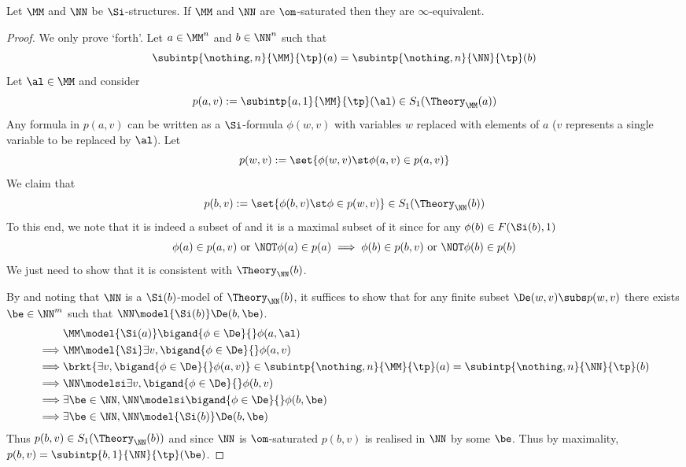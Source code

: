 \begin{prop}
    Let $\MM$ and $\NN$ be $\Si$-structures.
    If $\MM$ and $\NN$ are $\om$-saturated %
    then they are $\infty$-equivalent.
\end{prop}
\begin{proof}
    We only prove `forth'.
    Let $a \in \MM^n$ and $b \in \NN^n$ such that 
    \[\subintp{\nothing,n}{\MM}{\tp}(a) = 
    \subintp{\nothing,n}{\NN}{\tp}(b)\]
    Let $\al \in \MM$ and consider 
    \[p(a,v) := \subintp{a,1}{\MM}{\tp}(\al) \in S_1(\Theory_\MM(a))\]
    Any formula in $p(a,v)$ can be written as a 
    $\Si$-formula $\phi(w,v)$ with variables $w$
    replaced with elements of $a$ 
    ($v$ represents a single variable to be replaced by $\al$). 
    Let 
    \[p(w,v) := \set{\phi(w,v) \st \phi(a,v) \in p(a,v)}\]
    We claim that 
    \[p(b,v) := \set{\phi(b,v) \st \phi \in p(w,v)} \in S_1(\Theory_\NN(b))\]
    To this end, we note that it is indeed a subset of 
    and it is a maximal subset of it since for any $\phi(b) \in F(\Si(b),1)$
    \[\phi(a) \in p(a,v) \text{ or } \NOT \phi(a) \in p(a) \implies 
    \phi(b) \in p(b,v) \text{ or } \NOT \phi(b) \in p(b)\]
    We just need to show that it is consistent with $\Theory_\NN(b)$.

    By  
    and noting that $\NN$ is a $\Si(b)$-model of $\Theory_\NN(b)$,
    it suffices to show
    that for any finite subset $\De(w,v) \subs p(w,v)$ 
    there exists $\be \in \NN^m$ such that 
    $\NN \model{\Si(b)} \De(b,\be)$.
    \begin{align*}
        &\MM \model{\Si(a)} \bigand{\phi \in \De}{} \phi(a,\al)\\
        \implies &\MM \model{\Si} \exists v, \bigand{\phi \in \De}{} \phi(a,v)\\
        \implies &\brkt{\exists v, \bigand{\phi \in \De}{} \phi(a,v)} \in 
        \subintp{\nothing,n}{\MM}{\tp}(a) = 
        \subintp{\nothing,n}{\NN}{\tp}(b)\\
        \implies &\NN \modelsi \exists v, \bigand{\phi \in \De}{} \phi(b,v)\\
        \implies &\exists \be \in \NN, 
        \NN \modelsi \bigand{\phi \in \De}{} \phi(b,\be)\\
        \implies &\exists \be \in \NN, \NN \model{\Si(b)} \De(b,\be)
    \end{align*}
    Thus $p(b,v)\in S_1(\Theory_\NN(b))$ and since $\NN$ is $\om$-saturated
    $p(b,v)$ is realised in $\NN$ by some $\be$.
    Thus by maximality, $p(b,v) = \subintp{b,1}{\NN}{\tp}(\be)$.


\end{proof}

